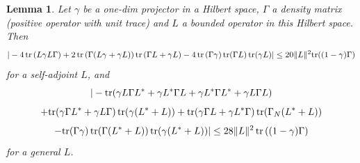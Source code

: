\documentclass[12pt]{article}
\def\tr{\rm{tr}}
\def\ga{\gamma}
\newtheorem{lemma}{Lemma}[section]
\newcommand{\Ga}{\Gamma}
\begin{document}
\begin{lemma}
 \label{lemmaonspectraces}
 Let $\ga$ be a one-dim projector in a Hilbert space, $\Ga$ a density matrix (positive operator with unit trace)
 and $L$ a bounded operator in this Hilbert space.  Then
 \begin{equation}
\label{eq1lemmaonspectraces}
|-4\,{\tr}\, (L\ga L\Ga )+2 \,{\tr}\,(\Ga(L \ga+\ga L))\,{\tr}\,(\Ga L+\ga L)
-4 \,{\tr}\,(\Ga \ga)\, {\tr} (\Ga L)\, {\tr} (\ga L)|
\le 20 \|L\|^2 {\tr} ((1-\ga) \Ga)
\end{equation}
for a self-adjoint $L$, and
 \[
|-{\tr} (\ga L \Ga L^*+\ga L^* \Ga L +\ga L^*\Ga L^*+\ga L \Ga L)
\]
\[
+ {\tr} (\ga \Ga L^*+\ga L \Ga) \, {\tr} (\ga(L^*+L))
+ {\tr} (\ga \Ga L+ \ga L^* \Ga) \, {\tr} (\Ga_N(L^*+L))
\]
 \begin{equation}
\label{eq2lemmaonspectraces}
-{\tr} (\Ga \ga)\, {\tr} (\Ga(L^*+L))\, {\tr} (\ga(L^*+L))|
\le 28 \|L\|^2 \, {\tr}\, ((1-\ga) \Ga)
\end{equation}
 for a general $L$.
 \end{lemma}
\end{document}
